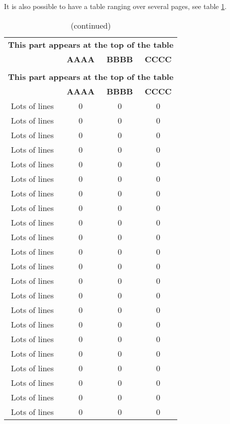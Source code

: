 It is also possible to have a table ranging over several pages, see table \ref{tab:SeveralPgs}.

\begin{longtable}{@{\extracolsep{\fill}}cccc}
\caption{Table ranging over several pages}
\label{tab:SeveralPgs}
\\
%
\toprule
\toprule
%
\multicolumn{4}{c}{\textbf{This part appears at the top of the table}}\\
 & \textbf{AAAA} & \textbf{BBBB} & \textbf{CCCC} \\
%
\midrule
%
\endfirsthead
\caption{(continued)}\\
%
\toprule
\toprule
%
\multicolumn{4}{c}{\textbf{This part appears at the top of the table}}\\
 & \textbf{AAAA} & \textbf{BBBB} & \textbf{CCCC} \\
%
\midrule
%
\endhead
\bottomrule
\bottomrule
%
\endfoot
%
Lots of lines & 0 & 0 & 0 \\
Lots of lines & 0 & 0 & 0 \\
Lots of lines & 0 & 0 & 0 \\
Lots of lines & 0 & 0 & 0 \\
Lots of lines & 0 & 0 & 0 \\
Lots of lines & 0 & 0 & 0 \\
Lots of lines & 0 & 0 & 0 \\
Lots of lines & 0 & 0 & 0 \\
Lots of lines & 0 & 0 & 0 \\
Lots of lines & 0 & 0 & 0 \\
Lots of lines & 0 & 0 & 0 \\
Lots of lines & 0 & 0 & 0 \\
Lots of lines & 0 & 0 & 0 \\
Lots of lines & 0 & 0 & 0 \\
Lots of lines & 0 & 0 & 0 \\
Lots of lines & 0 & 0 & 0 \\
Lots of lines & 0 & 0 & 0 \\
Lots of lines & 0 & 0 & 0 \\
Lots of lines & 0 & 0 & 0 \\
Lots of lines & 0 & 0 & 0 \\
Lots of lines & 0 & 0 & 0 \\
Lots of lines & 0 & 0 & 0 \\

\end{longtable}
